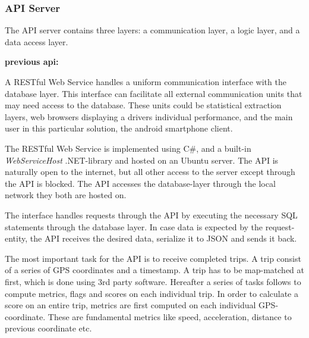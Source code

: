 \subsubsection{API Server}\label{sec:api_server}
The API server contains three layers: a communication layer, a logic layer, and a data access layer.

\textbf{previous api:}

A RESTful Web Service handles a uniform communication interface with the database layer. This interface can facilitate all external communication units that may need access to the database. These units could be statistical extraction layers, web browsers displaying a drivers individual performance, and the main user in this particular solution, the android smartphone client. 

The RESTful Web Service is implemented using C\#, and a built-in \textit{WebServiceHost} .NET-library and hosted on an Ubuntu server. The API is naturally open to the internet, but all other access to the server except through the API is blocked. The API accesses the database-layer through the local network they both are hosted on.

The interface handles requests through the API by executing the necessary SQL statements through the database layer. In case data is expected by the request-entity, the API receives the desired data, serialize it to JSON and sends it back.

The most important task for the API is to receive completed trips. A trip consist of a series of GPS coordinates and a timestamp. A trip has to be map-matched at first, which is done using 3rd party software\cite{trackmatch}. Hereafter a series of tasks follows to compute metrics, flags and scores on each individual trip\cite{sw9_report}. In order to calculate a score on an entire trip, metrics are first computed on each individual GPS-coordinate. These are fundamental metrics like speed, acceleration, distance to previous coordinate etc. 


